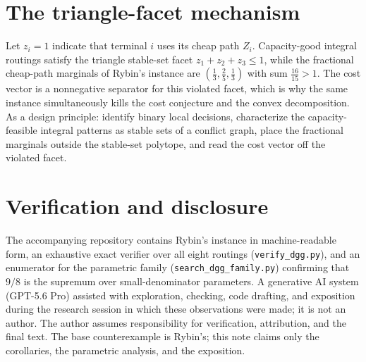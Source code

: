 \documentclass[11pt]{article}
\theoremstyle{definition}
\begin{document}
\section{The triangle-facet mechanism}

Let $z_i=1$ indicate that terminal $i$ uses its cheap path $Z_i$.
Capacity-good integral routings satisfy the triangle stable-set facet
$z_1+z_2+z_3\le1$, while the fractional cheap-path marginals of Rybin's
instance are $(\tfrac13,\tfrac25,\tfrac13)$ with sum $\tfrac{16}{15}>1$.  The
cost vector is a nonnegative separator for this violated facet, which is why
the same instance simultaneously kills the cost conjecture and the convex
decomposition.  As a design principle: identify binary local decisions,
characterize the capacity-feasible integral patterns as stable sets of a
conflict graph, place the fractional marginals outside the stable-set
polytope, and read the cost vector off the violated facet.

\section{Verification and disclosure}

The accompanying repository contains Rybin's instance in machine-readable
form, an exhaustive exact verifier over all eight routings
(\texttt{verify\_dgg.py}), and an enumerator for the parametric family
(\texttt{search\_dgg\_family.py}) confirming that $9/8$ is the supremum over
small-denominator parameters.  A generative AI system (GPT-5.6 Pro) assisted
with exploration, checking, code drafting, and exposition during the research
session in which these observations were made; it is not an author.  The
author assumes responsibility for verification, attribution, and the final
text.  The base counterexample is Rybin's; this note claims only the
corollaries, the parametric analysis, and the exposition.



\end{document}
